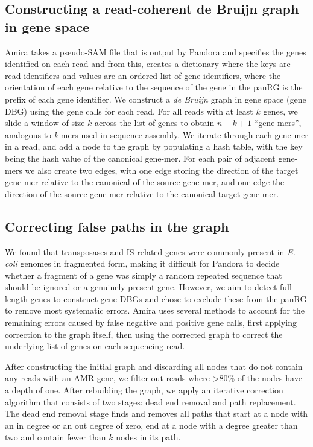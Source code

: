 \subsection*{Constructing a read-coherent de Bruijn graph in gene space}

Amira takes a pseudo-SAM file that is output by Pandora and specifies the genes identified on each read and from this, creates a dictionary where the keys are read identifiers and values are an ordered list of gene identifiers, where the orientation of each gene relative to the sequence of the gene in the panRG is the prefix of each gene identifier. We construct a \textit{de Bruijn} graph in gene space (gene DBG) using the gene calls for each read. For all reads with at least $k$ genes, we slide a window of size $k$ across the list of genes to obtain $n - k + 1$ “gene-mers”, analogous to \textit{k}-mers used in sequence assembly. We iterate through each gene-mer in a read, and add a node to the graph by populating a hash table, with the key being the hash value of the canonical gene-mer. For each pair of adjacent gene-mers we also create two edges, with one edge storing the direction of the target gene-mer relative to the canonical of the source gene-mer, and one edge the direction of the source gene-mer relative to the canonical target gene-mer.

\subsection*{Correcting false paths in the graph}

We found that transposases and IS-related genes were commonly present in \textit{E. coli} genomes in fragmented form, making it difficult for Pandora to decide whether a fragment of a gene was simply a random repeated sequence that should be ignored or a genuinely present gene. However, we aim to detect full-length genes to construct gene DBGs and chose to exclude these from the panRG to remove most systematic errors. Amira uses several methods to account for the remaining errors caused by false negative and positive gene calls, first applying correction to the graph itself, then using the corrected graph to correct the underlying list of genes on each sequencing read.  

After constructing the initial graph and discarding all nodes that do not contain any reads with an AMR gene, we filter out reads where >80\% of the nodes have a depth of one. After rebuilding the graph, we apply an iterative correction algorithm that consists of two stages: dead end removal and path replacement. The dead end removal stage finds and removes all paths that start at a node with an in degree or an out degree of zero, end at a node with a degree greater than two and contain fewer than $k$ nodes in its path.
 
